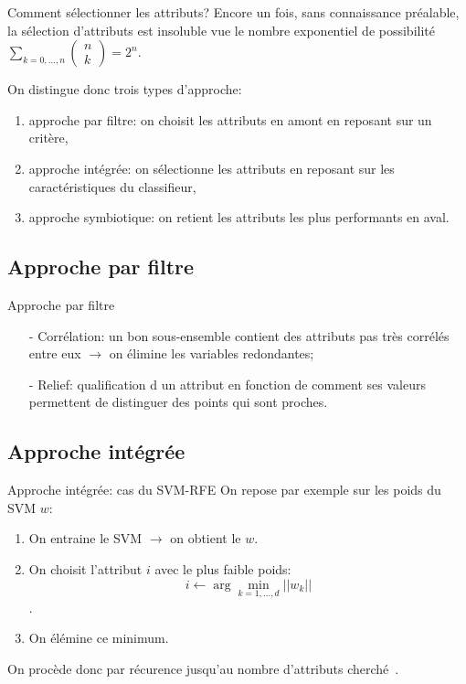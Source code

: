 \documentclass[9pt]{beamer}
\begin{document}
	\begin{frame}{Comment sélectionner les attributs?}
		Encore un fois, sans connaissance préalable, la sélection d'attributs est insoluble vue le nombre exponentiel de possibilité $\sum_{k=0,\dots,n} \begin{pmatrix}
		n\\
		k
		\end{pmatrix} = 2^n$.

		On distingue donc trois types d'approche:
		\begin{enumerate}
			\item<1-> approche par filtre: on choisit les attributs en amont en reposant sur un critère,
			\item<2-> approche intégrée: on sélectionne les attributs en reposant sur les caractéristiques du classifieur,
			\item<3-> approche symbiotique: on retient les attributs les plus performants en aval.
		\end{enumerate}
	\end{frame}

	\subsection[filter approach]{Approche par filtre}
	\begin{frame}{Approche par filtre}
		\begin{itemize}
			\item[-] Corrélation: un bon sous-ensemble contient des attributs pas très corrélés entre eux $\longrightarrow$ on élimine les variables redondantes;
			\item[-] Relief: qualification d un attribut en fonction de comment ses valeurs permettent de distinguer des points qui sont proches.
		\end{itemize}
	\end{frame}

	\subsection[integrated approach]{Approche intégrée}
	\begin{frame}{Approche intégrée: cas du SVM-RFE}
		On repose par exemple sur les poids du SVM $w$:
		\begin{enumerate}
			\item<1-> On entraine le SVM $\longrightarrow$ on obtient le $w$.
			\item<2-> On choisit l'attribut $i$ avec le plus faible poids:
			$$ i \leftarrow \arg \min_{k=1,\dots,d}{\vert\vert w_k\vert\vert}$$.
			\item<3-> On élémine ce minimum.
		\end{enumerate}
		On procède donc par récurence jusqu'au nombre d'attributs cherché~\cite{Guyon2002}.
	\end{frame}
\end{document}
